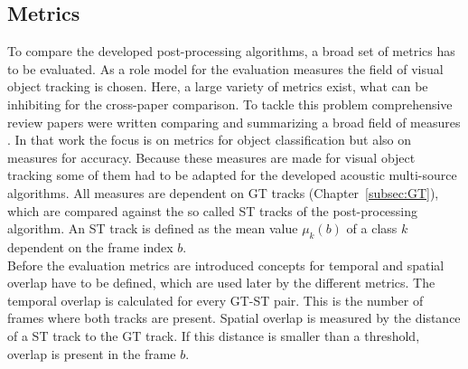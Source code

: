 \subsection{Metrics}
\label{subsec:metrics}
To compare the developed post-processing algorithms, a broad set of metrics has to be evaluated. As a role model for the evaluation measures the field of visual object tracking is chosen. Here, a large variety of metrics exist, what can be inhibiting for the cross-paper comparison. To tackle this problem comprehensive review papers were written comparing and summarizing a broad field of measures \cite{yin2007performance,baumann2008review,vcehovin2016visual}. In that work the focus is on metrics for object classification but also on measures for accuracy. Because these measures are made for visual object tracking some of them had to be adapted for the developed acoustic multi-source algorithms. All measures are dependent on \ac{GT} tracks (Chapter~\ref{subsec:GT}), which are compared against the so called \ac{ST} tracks of the post-processing algorithm. An \ac{ST} track is defined as the mean value $\mu_k(b)$ of a class $k$ dependent on the frame index $b$.\\
Before the evaluation metrics are introduced concepts for temporal and spatial overlap have to be defined, which are used later by the different metrics. The temporal overlap is calculated for every GT-\ac{ST} pair. This is the number of frames where both tracks are present.
Spatial overlap is measured by the distance of a \ac{ST} track to the \ac{GT} track. If this distance is smaller than a threshold,
overlap is present in the frame $b$.
